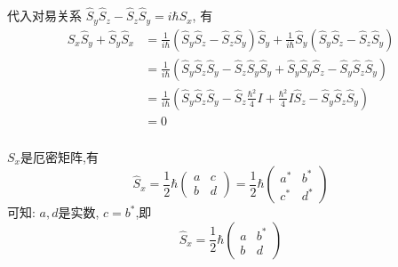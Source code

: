 \begin{frame}[label=current]
  \frametitle{}
  \证
  代入对易关系 $ \hat{S}_y \hat{S}_z - \hat{S}_z \hat{S}_y = i\hbar S_x  $, 有 
  \[ \begin{aligned}
    \hat{S}_x \hat{S}_y + \hat{S}_y \hat{S}_x  &=\frac{1}{i\hbar}(\hat{S}_y \hat{S}_z - \hat{S}_z \hat{S}_y)\hat{S}_y + \frac{1}{i\hbar}\hat{S}_y(\hat{S}_y \hat{S}_z - \hat{S}_z \hat{S}_y)  \\ 
    &= \frac{1}{i\hbar}(\hat{S}_y \hat{S}_z \hat{S}_y -   \hat{S}_z \hat{S}_y\hat{S}_y + \hat{S}_y \hat{S}_y \hat{S}_z - \hat{S}_y \hat{S}_z \hat{S}_y)\\
    &= \frac{1}{i\hbar}(\hat{S}_y \hat{S}_z \hat{S}_y -   \hat{S}_z \frac{\hbar^2}{4} I + \frac{\hbar^2}{4} I \hat{S}_z - \hat{S}_y \hat{S}_z \hat{S}_y) \\
    &= 0
  \end{aligned}\]
\end{frame} 

\begin{frame}[label=current]
  \frametitle{}
  \证 $S_x$是厄密矩阵,有 
  \[\hat{S}_x = \frac{1}{2}\hbar\begin{pmatrix}
    a & c\\
    b & d
   \end{pmatrix} = \frac{1}{2}\hbar\begin{pmatrix}
    a^* & b^*\\
    c^* & d^*
   \end{pmatrix} \]
   可知: $a, d$是实数, $c=b^*$,即
   \[\hat{S}_x = \frac{1}{2}\hbar\begin{pmatrix}
    a & b^*\\
    b & d
   \end{pmatrix}\]
\end{frame} 

